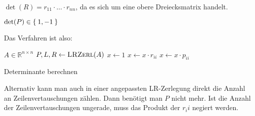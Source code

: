 $\det(R) = r_{11} \cdot \ldots \cdot r_{nn}$, da es sich um eine obere Dreiecksmatrix handelt.


$\det(P) \in \Set{1, -1}$

Das Verfahren ist also:

\begin{algorithm}[H]
    \begin{algorithmic}
        \Require $A \in \mathbb{R}^{n \times n}$
        \State $P, L, R \gets \Call{LRZerl}{A}$
        \State $x \gets 1$
            \State $x \gets x \cdot r_{ii}$
            \State $x \gets x \cdot p_{ii}$
        \EndFor
    \end{algorithmic}
\caption{Determinante berechnen}
\label{alg:seq1}
\end{algorithm}

Alternativ kann man auch in einer angepassten LR-Zerlegung direkt die
Anzahl an Zeilenvertauschungen zählen. Dann benötigt man $P$ nicht mehr.
Ist die Anzahl der Zeilenvertauschungen ungerade, muss das Produkt 
der $r_ii$ negiert werden.
